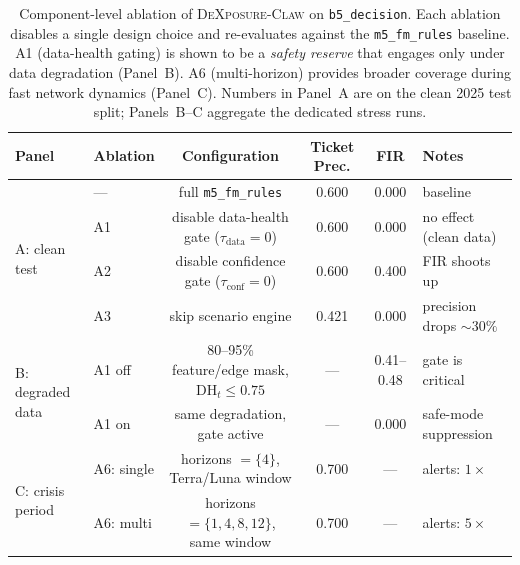 \begin{table}[t]
\centering
\footnotesize
\setlength{\tabcolsep}{4pt}
\caption{Component-level ablation of \textsc{DeXposure-Claw} on
\texttt{b5\_decision}. Each ablation disables a single design choice and
re-evaluates against the \texttt{m5\_fm\_rules} baseline. A1 (data-health
gating) is shown to be a \emph{safety reserve} that engages only under
data degradation (Panel~B). A6 (multi-horizon) provides broader coverage
during fast network dynamics (Panel~C). Numbers in Panel~A are on the
clean 2025 test split; Panels~B--C aggregate the dedicated stress runs.}
\label{tab:ablation}
\begin{tabular}{l l c c c l}
\toprule
Panel & Ablation & Configuration & Ticket Prec. & FIR & Notes \\
\midrule
\multirow{4}{*}{A: clean test}
 & ---  & full \texttt{m5\_fm\_rules}                                       & 0.600 & 0.000 & baseline \\
 & A1   & disable data-health gate ($\tau_{\mathrm{data}}{=}0$)             & 0.600 & 0.000 & no effect (clean data) \\
 & A2   & disable confidence gate ($\tau_{\mathrm{conf}}{=}0$)              & 0.600 & 0.400 & FIR shoots up \\
 & A3   & skip scenario engine                                              & 0.421 & 0.000 & precision drops $\sim30\%$ \\
\midrule
\multirow{2}{*}{B: degraded data}
 & A1 off & 80--95\% feature/edge mask, $\mathrm{DH}_t{\le}0.75$            & ---   & 0.41--0.48 & gate is critical \\
 & A1 on  & same degradation, gate active                                   & ---   & 0.000      & safe-mode suppression \\
\midrule
\multirow{2}{*}{C: crisis period}
 & A6: single & horizons $=\{4\}$, Terra/Luna window                        & 0.700 & ---        & alerts: $1\times$ \\
 & A6: multi  & horizons $=\{1,4,8,12\}$, same window                       & 0.700 & ---        & alerts: $5\times$ \\
\bottomrule
\end{tabular}
\end{table}
